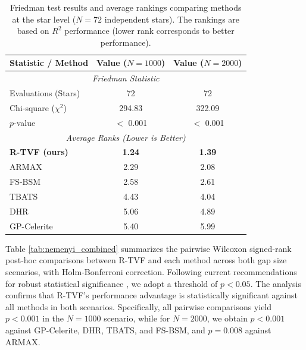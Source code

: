 \documentclass[a4paper,fleqn]{cas-sc}
\begin{document}
\begin{table}[htbp]
\centering
\caption{Friedman test results and average rankings comparing methods at the star level ($N=72$ independent stars). The rankings are based on $R^2$ performance (lower rank corresponds to better performance).}
\label{tab:friedman_combined}
\begin{tabular}{lcc}
\toprule
\textbf{Statistic / Method} & \textbf{Value ($N=1000$)} & \textbf{Value ($N=2000$)} \\
\midrule
\multicolumn{3}{c}{\textit{Friedman Statistic}} \\
 Evaluations (Stars) & 72 & 72 \\
Chi-square ($\chi^2$) & 294.83 & 322.09 \\
$p$-value & $<$ 0.001 & $<$ 0.001 \\
\midrule
\multicolumn{3}{c}{\textit{Average Ranks (Lower is Better)}} \\
\textbf{R-TVF (ours)} & \textbf{1.24} & \textbf{1.39} \\
ARMAX & 2.29 & 2.08 \\
FS-BSM & 2.58 & 2.61 \\
TBATS & 4.43 & 4.04 \\
DHR & 5.06 & 4.89 \\
GP-Celerite & 5.40 & 5.99 \\
\bottomrule
\end{tabular}
\end{table}




Table \ref{tab:nemenyi_combined} summarizes the pairwise Wilcoxon signed-rank post-hoc comparisons between R-TVF and each method across both gap size scenarios, with Holm-Bonferroni correction. Following current recommendations for robust statistical significance \cite{lakens2018justify}, we adopt a threshold of $p < 0.05$. The analysis confirms that R-TVF's performance advantage is statistically significant against all methods in both scenarios. Specifically, all pairwise comparisons yield $p < 0.001$ in the $N=1000$ scenario, while for $N=2000$, we obtain $p < 0.001$ against GP-Celerite, DHR, TBATS, and FS-BSM, and $p = 0.008$ against ARMAX.
\end{document}
